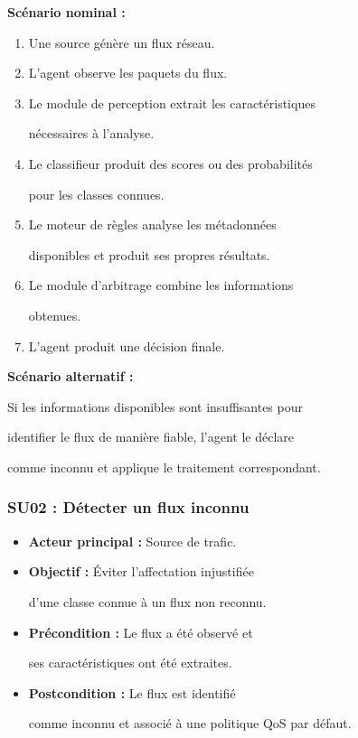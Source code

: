 \textbf{Scénario nominal :}

\begin{enumerate}

    \item Une source génère un flux réseau.

    \item L'agent observe les paquets du flux.

    \item Le module de perception extrait les caractéristiques

    nécessaires à l'analyse.

    \item Le classifieur produit des scores ou des probabilités

    pour les classes connues.

    \item Le moteur de règles analyse les métadonnées

    disponibles et produit ses propres résultats.

    \item Le module d'arbitrage combine les informations

    obtenues.

    \item L'agent produit une décision finale.

\end{enumerate}



\textbf{Scénario alternatif :}

Si les informations disponibles sont insuffisantes pour

identifier le flux de manière fiable, l'agent le déclare

comme inconnu et applique le traitement correspondant.





\subsubsection{SU02 : Détecter un flux inconnu}



\begin{itemize}

    \item \textbf{Acteur principal :} Source de trafic.

    \item \textbf{Objectif :} Éviter l'affectation injustifiée

    d'une classe connue à un flux non reconnu.

    \item \textbf{Précondition :} Le flux a été observé et

    ses caractéristiques ont été extraites.

    \item \textbf{Postcondition :} Le flux est identifié

    comme inconnu et associé à une politique QoS par défaut.

\end{itemize}



